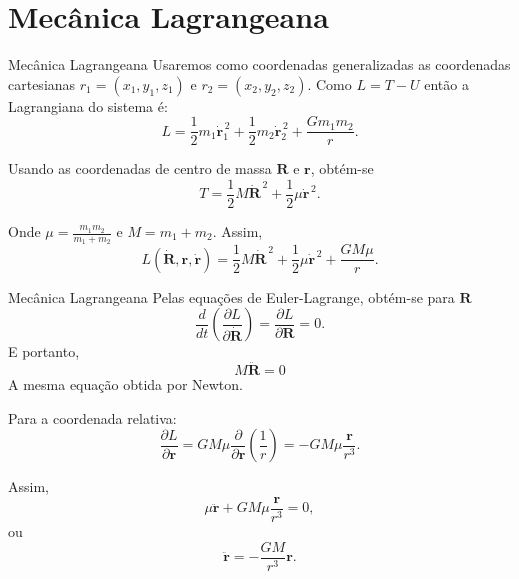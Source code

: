 \documentclass[10pt]{beamer}
\begin{document}
\section{Mecânica Lagrangeana}
\begin{frame}{Mecânica Lagrangeana}
Usaremos como coordenadas generalizadas as coordenadas cartesianas
$r_1 = (x_1, y_1, z_1)$ e $r_2 = (x_2, y_2, z_2)$. Como $L=T-U$ então a Lagrangiana do sistema é:
\begin{equation*}
L=
\frac{1}{2}m_1\dot{\bm r}_1^{\,2}
+\frac{1}{2}m_2\dot{\bm r}_2^{\,2}
+\frac{Gm_1m_2}{r}.
\end{equation*}

    Usando as coordenadas de centro de massa $\bm R$ e $\bm r$, obtém-se
    \begin{equation*}
T=
\frac{1}{2}M\dot{\bm R}^{\,2}
+\frac{1}{2}\mu\dot{\bm r}^{\,2}.
\end{equation*}

Onde $\mu=\frac{m_1 m_2}{m_1+m_2}$ e $M=m_1+m_2$.
Assim,
\begin{equation*}
L(\dot{\bm R},\bm r,\dot{\bm r})
=
\frac{1}{2}M\dot{\bm R}^{\,2}
+\frac{1}{2}\mu\dot{\bm r}^{\,2}
+\frac{GM\mu}{r}.
\end{equation*}
\end{frame}

\begin{frame}{Mecânica Lagrangeana}
Pelas equações de Euler-Lagrange, obtém-se para $\bm R$
\begin{equation*}
\frac{d}{dt}
\left(
\frac{\partial L}{\partial \dot {\bm R}}
\right) =
\frac{\partial L}{\partial \bm R}=0.
\end{equation*}
E portanto,
$$M \ddot{\bm R}=0$$
A mesma equação obtida por Newton.

Para a coordenada relativa:
\begin{equation*}
\frac{\partial L}{\partial \bm r}
=GM\mu\frac{\partial}{\partial \bm r}
\left(\frac{1}{r}\right)
=-GM\mu\frac{\bm r}{r^3}.
\end{equation*}

Assim,
\begin{equation*}
\mu\ddot{\bm r}+GM\mu\frac{\bm r}{r^3}=0,
\end{equation*}
ou
\begin{equation*}
\boxed{
\ddot{\bm r}=-\frac{GM}{r^3}\bm r
}.
\end{equation*}
\end{frame}
\end{document}
